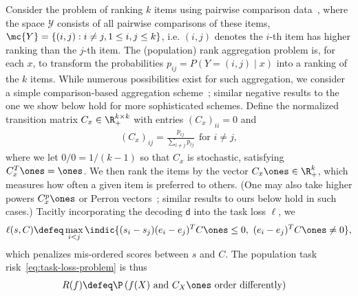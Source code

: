 \documentclass[11pt]{article}
\newcommand{\pred}{\mathsf{d}}  %
\newcommand{\tloss}{\ell}  %
\newcommand{\sloss}{\varphi}  %
\begin{document}
Consider the problem of ranking $k$ items using pairwise comparison
data~\citep{Keener93, DworkKuNaSi01, DuchiMaJo12, NegahbanOhSh16},
where the space $\mathcal{Y}$ consists of all pairwise comparisons of these
items, $\mc{Y} = \{(i,j): i \neq j, 1 \leq i, j \leq k\}$, i.e. $(i,j)$ denotes the $i$-th item has higher ranking than the $j$-th item.
%
The (population) rank aggregation problem is, for each $x$,
to transform the
probabilities $p_{ij} = P(Y = (i,j) \mid x)$ into a
ranking of the $k$ items.
%
While numerous possibilities exist for such aggregation, we consider a
simple comparison-based aggregation scheme~\citep[cf.][]{Keener93}; similar
negative results to the one we show below hold for more sophisticated
schemes.
%
Define the normalized transition matrix $C_x \in \R_+^{k \times
  k}$ with entries $(C_x)_{ii} = 0$ and
\begin{align*}
  (C_x)_{ij} = 
  \frac{p_{ij}}{\sum_{l \neq j} p_{lj}}
  ~~ \mbox{for~} i \neq j,
\end{align*}
where we let $0/0 = 1/(k-1)$ so that $C_x$ is stochastic, satisfying $C_x^T
\ones = \ones$.
%
We then rank the items by the vector $C_x \ones \in \R_+^k$,
which measures how often a given item is preferred to others.
%
(One may also
take higher powers $C_x^p \ones$ or Perron vectors~\citep{Keener93}; similar
results to ours below hold in such cases.)
%
Tacitly incorporating the decoding $\pred$ into the task loss $\tloss$,
we
\begin{equation*}
  \tloss(s, C) \defeq
  \max_{i < j} \indic{ (s_i - s_j) (e_i - e_j)^T C \ones \le 0,
  ~ (e_i - e_j)^T C \ones \neq 0 },
\end{equation*}
which penalizes mis-ordered scores between $s$ and $C$.
%
The population task risk~\eqref{eq:task-loss-problem} is thus
\begin{align}
  R(f) & \defeq
  \P\left(f(X) \text{ and } C_X\ones \text{ order differently}\right)
  \label{eq:task-risk-ranking}
\end{align}

\end{document}
